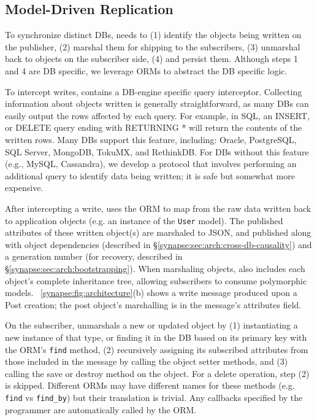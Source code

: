 \subsection{Model-Driven Replication}
\label{synapse:sec:arch:cross-db-propagation}

To synchronize distinct DBs, \synapse needs to (1) identify the objects being
written on the publisher, (2) marshal them for shipping to the subscribers, (3)
unmarshal back to objects on the subscriber side, (4) and persist them.
Although steps 1 and 4 are DB specific, we leverage ORMs to abstract the DB
specific logic.

To intercept writes, \synapse contains a DB-engine specific query interceptor.
Collecting information about objects written is
generally straightforward, as many DBs can easily output the rows affected
by each query. For example, in SQL, an {\code INSERT}, or {\code DELETE}
query ending with {\code RETURNING *} will return the contents of the
written rows. Many DBs support this feature, including: Oracle, PostgreSQL, SQL
Server, MongoDB, TokuMX, and RethinkDB. For DBs without this feature
(e.g., MySQL, Cassandra), we develop a protocol that involves performing an additional
query to identify data being written; it is safe but somewhat more expensive.

After intercepting a write, \synapse uses the ORM to map from the raw data
written back to application objects (e.g. an instance of the {\tt User} model).
The published attributes of these written object(s) are marshaled to JSON, and published
along with object dependencies (described in
\S\ref{synapse:sec:arch:cross-db-causality}) and a generation number (for recovery,
described in \S\ref{synapse:sec:arch:bootstrapping}). When marshaling objects,
\synapse also includes each object's complete inheritance tree, allowing
subscribers to consume polymorphic models.
\F~\ref{synapse:fig:architecture}(b) shows a write message produced
upon a {\code Post} creation; the post object's marshalling is in the message's
{\code attributes} field.

On the subscriber, \synapse unmarshals a new or updated object by (1)
instantiating a new instance of that type, or finding it in the DB based on its primary key with
the ORM's {\tt find} method, (2) recursively assigning its
subscribed attributes from those included in the message by calling the
object setter methods, and (3) calling the {\code save} or {\code
destroy} method on the object. For a delete operation, step (2) is skipped.
Different ORMs may have different names for these methods (e.g. {\tt find} vs
{\tt find\_by}) but their translation is trivial. Any callbacks specified by the
programmer are automatically called by the ORM.


